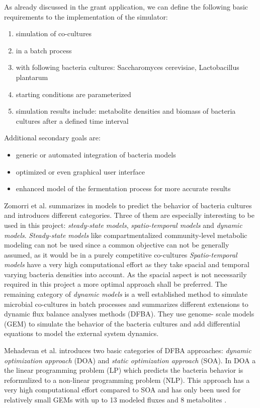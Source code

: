\documentclass[a4paper,10pt]{article}
\begin{document}
As already discussed in the grant application, we can define the following basic requirements to the implementation of the simulator:
\begin{enumerate}
 \item simulation of co-cultures
 \item in a batch process
 \item with following bacteria cultures: Saccharomyces cerevisiae, Lactobacillus plantarum
 \item starting conditions are parameterized
 \item simulation results include: metabolite densities and biomass of bacteria cultures after a defined time interval
\end{enumerate}
Additional secondary goals are:
\begin{itemize}
 \item generic or automated integration of bacteria models
 \item optimized or even graphical user interface
 \item enhanced model of the fermentation process for more accurate results
\end{itemize}

\vspace{0.5cm}

Zomorri et al. summarizes in \cite{zomorrodi_synthetic_2016} models to predict the behavior of bacteria cultures and introduces
different categories. Three of them are especially
interesting to be used in this project: \textit{steady-state models}, \textit{spatio-temporal models} and \textit{dynamic models}.
\textit{Steady-state models} like compartmentalized community-level metabolic modeling can not be used
since a common objective can not be generally assumed, as it would be in a purely competitive co-cultures
\textit{Spatio-temporal models} have a very high computational effort as they take spacial and temporal varying bacteria densities
into account. As the spacial aspect is not necessarily required in this project a more optimal approach shall be preferred.
The remaining category of \textit{dynamic models} is a well established method to simulate microbial co-cultures in batch processes
and summarizes different extensions to dynamic flux balance analyses methods (DFBA)\cite{zomorrodi_synthetic_2016}. They use genome-
scale models (GEM) to simulate the behavior of the bacteria cultures and add differential equations to model the external system dynamics.

Mehadevan et al. introduces two basic categories of DFBA approaches: \textit{dynamic optimization approach} (DOA) and \textit{static
optimization approach} (SOA)\cite{mahadevan_dynamic_2002}. In DOA a the linear programming problem (LP) which predicts the bacteria
behavior is reformulized to a non-linear programming problem (NLP). This approach has a very high computational effort
\cite{hoffner_reliable_2013} compared to SOA and has only been used for relatively small GEMs with up to 13 modeled fluxes and 8 metabolites
\cite{luo_dynamic_2006} \cite{luo_photosynthetic_2009}.
\end{document}
